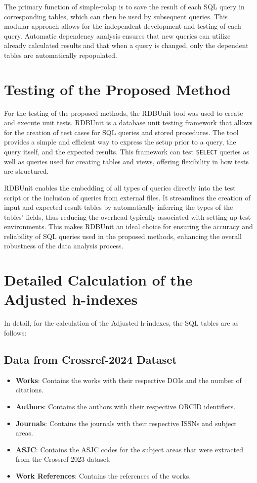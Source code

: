 The primary function of simple-rolap is to save the result of each SQL query in
corresponding tables, which can then be used by subsequent queries. This
modular approach allows for the independent development and testing of each
query. Automatic dependency analysis ensures that new queries can utilize
already calculated results and that when a query is changed, only the dependent
tables are automatically repopulated.

\section{Testing of the Proposed Method}
For the testing of the proposed methods, the RDBUnit \cite{rdbunit} tool was
used to create and execute unit tests. RDBUnit is a database unit testing
framework that allows for the creation of test cases for SQL queries and stored
procedures. The tool provides a simple and efficient way to express the setup
prior to a query, the query itself, and the expected results. This framework
can test \texttt{SELECT} queries as well as queries used for creating tables
and views, offering flexibility in how tests are structured.

RDBUnit enables the embedding of all types of queries directly into the test
script or the inclusion of queries from external files. It streamlines the
creation of input and expected result tables by automatically inferring the
types of the tables' fields, thus reducing the overhead typically associated
with setting up test environments. This makes RDBUnit an ideal choice for
ensuring the accuracy and reliability of SQL queries used in the proposed
methods, enhancing the overall robustness of the data analysis process.

\section{Detailed Calculation of the Adjusted h-indexes}

In detail, for the calculation of the Adjusted h-indexes, the SQL tables are as
follows:

\subsection{Data from Crossref-2024 Dataset}
\begin{itemize}
      \item \textbf{Works}: Contains the works with their respective DOIs and the number of citations.
      \item \textbf{Authors}: Contains the authors with their respective ORCID identifiers.
      \item \textbf{Journals}: Contains the journals with their respective ISSNs and subject areas.
      \item \textbf{ASJC}: Contains the ASJC codes for the subject areas that were extracted from the Crossref-2023 dataset.
      \item \textbf{Work References}: Contains the references of the works.
\end{itemize}

